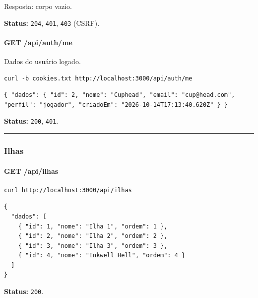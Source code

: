 Resposta: corpo vazio.

\textbf{Status:} \texttt{204}, \texttt{401}, \texttt{403} (CSRF).

\hypertarget{get-apiauthme}{%
\paragraph{GET /api/auth/me}\label{get-apiauthme}}

Dados do usuário logado.

\begin{Verbatim}[breaklines,breakanywhere,fontsize=\scriptsize]
curl -b cookies.txt http://localhost:3000/api/auth/me
\end{Verbatim}

\begin{Verbatim}[breaklines,breakanywhere,fontsize=\scriptsize]
{ "dados": { "id": 2, "nome": "Cuphead", "email": "cup@head.com", "perfil": "jogador", "criadoEm": "2026-10-14T17:13:40.620Z" } }
\end{Verbatim}

\textbf{Status:} \texttt{200}, \texttt{401}.

\begin{center}\rule{0.5\linewidth}{0.5pt}\end{center}

\hypertarget{ilhas}{%
\subsubsection{Ilhas}\label{ilhas}}

\hypertarget{get-apiilhas}{%
\paragraph{GET /api/ilhas}\label{get-apiilhas}}

\begin{Verbatim}[breaklines,breakanywhere,fontsize=\scriptsize]
curl http://localhost:3000/api/ilhas
\end{Verbatim}

\begin{Verbatim}[breaklines,breakanywhere,fontsize=\scriptsize]
{
  "dados": [
    { "id": 1, "nome": "Ilha 1", "ordem": 1 },
    { "id": 2, "nome": "Ilha 2", "ordem": 2 },
    { "id": 3, "nome": "Ilha 3", "ordem": 3 },
    { "id": 4, "nome": "Inkwell Hell", "ordem": 4 }
  ]
}
\end{Verbatim}

\textbf{Status:} \texttt{200}.

